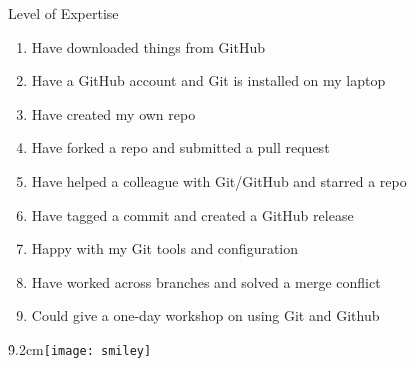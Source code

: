 \documentclass[aspectratio=169]{beamer}
\begin{document}
\begin{frame}{Level of Expertise}\small
  \begin{enumerate}
    \item Have downloaded things from GitHub \\[2ex]
    \item Have a GitHub account and Git is installed on my laptop\\[2ex]
    \item Have created my own repo \\[2ex]
    \item Have forked a repo and submitted a pull request \\[2ex]
    \item Have helped a colleague with Git/GitHub and starred a repo\\[2ex]
    \item Have tagged a commit and created a GitHub release\\[2ex]
    \item Happy with my Git tools and configuration \\[2ex]
    \item Have worked across branches and solved a merge conflict\\[2ex]
    \item Could give a one-day workshop on using Git and Github\\[2ex]
  \end{enumerate}
  \vspace{-5ex}
  \h{9.2cm}\texttt{[image: smiley]}
  \vspace{4ex}
\end{frame}







\begin{frame}[plain]
\end{frame}
\end{document}
